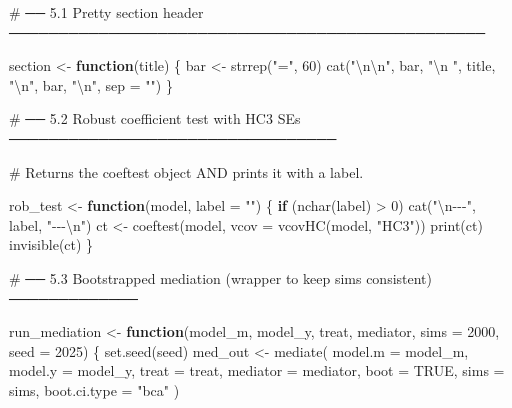 \documentclass[
  letterpaper,
  DIV=11,
  numbers=noendperiod]{scrartcl}
\newenvironment{Shaded}{\begin{snugshade}}{\end{snugshade}}
\newcommand{\AttributeTok}[1]{\textcolor[rgb]{0.40,0.45,0.13}{#1}}
\newcommand{\CommentTok}[1]{\textcolor[rgb]{0.37,0.37,0.37}{#1}}
\newcommand{\ConstantTok}[1]{\textcolor[rgb]{0.56,0.35,0.01}{#1}}
\newcommand{\ControlFlowTok}[1]{\textcolor[rgb]{0.00,0.23,0.31}{\textbf{#1}}}
\newcommand{\DecValTok}[1]{\textcolor[rgb]{0.68,0.00,0.00}{#1}}
\newcommand{\FunctionTok}[1]{\textcolor[rgb]{0.28,0.35,0.67}{#1}}
\newcommand{\NormalTok}[1]{\textcolor[rgb]{0.00,0.23,0.31}{#1}}
\newcommand{\OtherTok}[1]{\textcolor[rgb]{0.00,0.23,0.31}{#1}}
\newcommand{\SpecialCharTok}[1]{\textcolor[rgb]{0.37,0.37,0.37}{#1}}
\newcommand{\StringTok}[1]{\textcolor[rgb]{0.13,0.47,0.30}{#1}}
\begin{document}
\begin{Shaded}
\begin{Highlighting}[]
\CommentTok{\# ── 5.1  Pretty section header ────────────────────────────────────────────────}

\NormalTok{section }\OtherTok{\textless{}{-}} \ControlFlowTok{function}\NormalTok{(title) \{}
\NormalTok{  bar }\OtherTok{\textless{}{-}} \FunctionTok{strrep}\NormalTok{(}\StringTok{"="}\NormalTok{, }\DecValTok{60}\NormalTok{)}
  \FunctionTok{cat}\NormalTok{(}\StringTok{"}\SpecialCharTok{\textbackslash{}n\textbackslash{}n}\StringTok{"}\NormalTok{, bar, }\StringTok{"}\SpecialCharTok{\textbackslash{}n}\StringTok{ "}\NormalTok{, title, }\StringTok{"}\SpecialCharTok{\textbackslash{}n}\StringTok{"}\NormalTok{, bar, }\StringTok{"}\SpecialCharTok{\textbackslash{}n}\StringTok{"}\NormalTok{, }\AttributeTok{sep =} \StringTok{""}\NormalTok{)}
\NormalTok{\}}

\CommentTok{\# ── 5.2  Robust coefficient test with HC3 SEs ─────────────────────────────────}

\CommentTok{\# Returns the coeftest object AND prints it with a label.}

\NormalTok{rob\_test }\OtherTok{\textless{}{-}} \ControlFlowTok{function}\NormalTok{(model, }\AttributeTok{label =} \StringTok{""}\NormalTok{) \{}
  \ControlFlowTok{if}\NormalTok{ (}\FunctionTok{nchar}\NormalTok{(label) }\SpecialCharTok{\textgreater{}} \DecValTok{0}\NormalTok{) }\FunctionTok{cat}\NormalTok{(}\StringTok{"}\SpecialCharTok{\textbackslash{}n}\StringTok{{-}{-}{-}"}\NormalTok{, label, }\StringTok{"{-}{-}{-}}\SpecialCharTok{\textbackslash{}n}\StringTok{"}\NormalTok{)}
\NormalTok{  ct }\OtherTok{\textless{}{-}} \FunctionTok{coeftest}\NormalTok{(model, }\AttributeTok{vcov =} \FunctionTok{vcovHC}\NormalTok{(model, }\StringTok{"HC3"}\NormalTok{))}
  \FunctionTok{print}\NormalTok{(ct)}
  \FunctionTok{invisible}\NormalTok{(ct)}
\NormalTok{\}}

\CommentTok{\# ── 5.3  Bootstrapped mediation (wrapper to keep sims consistent) ─────────────}

\NormalTok{run\_mediation }\OtherTok{\textless{}{-}} \ControlFlowTok{function}\NormalTok{(model\_m, model\_y, treat, mediator,}
                           \AttributeTok{sims =} \DecValTok{2000}\NormalTok{, }\AttributeTok{seed =} \DecValTok{2025}\NormalTok{) \{}
  \FunctionTok{set.seed}\NormalTok{(seed)}
\NormalTok{  med\_out }\OtherTok{\textless{}{-}} \FunctionTok{mediate}\NormalTok{(}
    \AttributeTok{model.m       =}\NormalTok{ model\_m,}
    \AttributeTok{model.y       =}\NormalTok{ model\_y,}
    \AttributeTok{treat         =}\NormalTok{ treat,}
    \AttributeTok{mediator      =}\NormalTok{ mediator,}
    \AttributeTok{boot          =} \ConstantTok{TRUE}\NormalTok{,}
    \AttributeTok{sims          =}\NormalTok{ sims,}
    \AttributeTok{boot.ci.type  =} \StringTok{"bca"}
\NormalTok{  )}


\end{Highlighting}
\end{Shaded}
\end{document}

